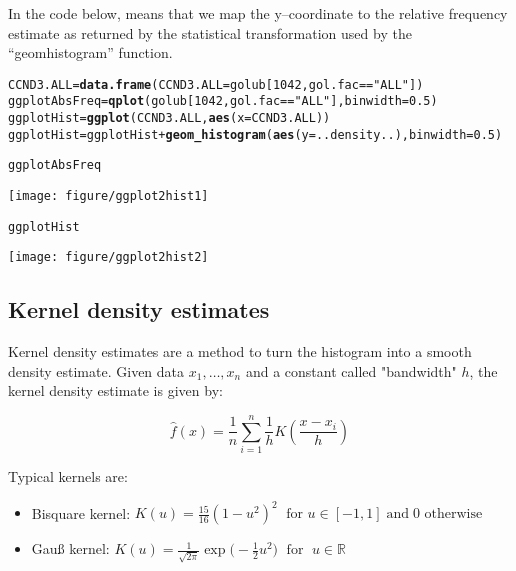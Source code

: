 \documentclass{article}\usepackage[]{graphicx}\usepackage[usenames,dvipsnames]{color}
\makeatletter
\def\maxwidth{ %
  \ifdim\Gin@nat@width>\linewidth
    \linewidth
  \else
    \Gin@nat@width
  \fi
}
\newcommand{\hlnum}[1]{\textcolor[rgb]{0.686,0.059,0.569}{#1}}%
\newcommand{\hlstr}[1]{\textcolor[rgb]{0.192,0.494,0.8}{#1}}%
\newcommand{\hlopt}[1]{\textcolor[rgb]{0,0,0}{#1}}%
\newcommand{\hlstd}[1]{\textcolor[rgb]{0.345,0.345,0.345}{#1}}%
\newcommand{\hlkwb}[1]{\textcolor[rgb]{0.69,0.353,0.396}{#1}}%
\newcommand{\hlkwc}[1]{\textcolor[rgb]{0.333,0.667,0.333}{#1}}%
\newcommand{\hlkwd}[1]{\textcolor[rgb]{0.737,0.353,0.396}{\textbf{#1}}}%
\newenvironment{kframe}{%
 \def\at@end@of@kframe{}%
 \ifinner\ifhmode%
  \def\at@end@of@kframe{\end{minipage}}%
  \begin{minipage}{\columnwidth}%
 \fi\fi%
 \def\FrameCommand##1{\hskip\@totalleftmargin \hskip-\fboxsep
 \colorbox{shadecolor}{##1}\hskip-\fboxsep
     \hskip-\linewidth \hskip-\@totalleftmargin \hskip\columnwidth}%
 \MakeFramed {\advance\hsize-\width
   \@totalleftmargin\z@ \linewidth\hsize
   \@setminipage}}%
 {\par\unskip\endMakeFramed%
 \at@end@of@kframe}
\newenvironment{knitrout}{}{} %
\makeatother
\begin{document}
In the code below,  means
that we map the y--coordinate to the relative frequency 
estimate as returned by the  
statistical transformation used  by the ``geom\textunderscore histogram'' 
function.

\begin{knitrout}
\color{fgcolor}\begin{kframe}
\begin{alltt}
\hlstd{CCND3.ALL} \hlkwb{=} \hlkwd{data.frame}\hlstd{(}\hlkwc{CCND3.ALL} \hlstd{= golub[}\hlnum{1042}\hlstd{, gol.fac}\hlopt{==}\hlstr{"ALL"}\hlstd{])}
\hlstd{ggplotAbsFreq} \hlkwb{=} \hlkwd{qplot}\hlstd{(golub[}\hlnum{1042}\hlstd{, gol.fac}\hlopt{==}\hlstr{"ALL"}\hlstd{],} \hlkwc{binwidth} \hlstd{=} \hlnum{0.5}\hlstd{)}
\hlstd{ggplotHist} \hlkwb{=} \hlkwd{ggplot}\hlstd{(CCND3.ALL,} \hlkwd{aes}\hlstd{(}\hlkwc{x}\hlstd{=CCND3.ALL ))}
\hlstd{ggplotHist} \hlkwb{=} \hlstd{ggplotHist} \hlopt{+} \hlkwd{geom_histogram}\hlstd{(}\hlkwd{aes}\hlstd{(}\hlkwc{y} \hlstd{= ..density..),} \hlkwc{binwidth} \hlstd{=} \hlnum{0.5}\hlstd{)}


\hlstd{ggplotAbsFreq}
\end{alltt}
\end{kframe}
\texttt{[image: figure/ggplot2hist1]} 
\begin{kframe}\begin{alltt}
\hlstd{ggplotHist}
\end{alltt}
\end{kframe}
\texttt{[image: figure/ggplot2hist2]} 

\end{knitrout}


\subsection{Kernel density estimates}
Kernel density estimates are a method to turn the histogram
into a smooth density estimate. Given data
$x_1, \dotsc, x_n$ and a constant called "bandwidth" $h$,
the kernel density estimate is given by:

\begin{center}
\[
\hat f(x)= \frac{1}{n}\sum_{i=1}^{n}  \frac{1}{h}K\left( \frac{x-x_i}{h} \right) 
\]
\end{center}

Typical kernels are:
\begin{itemize}
\item Bisquare kernel: $K(u) = \frac{15}{16}(1-u^2)^2 \; \text{ for } u \in [-1,1] \; \text{and} \; 0 \text{ otherwise }$
\item Gau{\ss} kernel: $K(u) = \frac{1}{\sqrt{2\pi}} \exp\Biggl(-\frac{1}{2} u^2  \Biggr) \; \text{ for } \; u \in \mathbb{R}$ 
\end{itemize}
\end{document}
